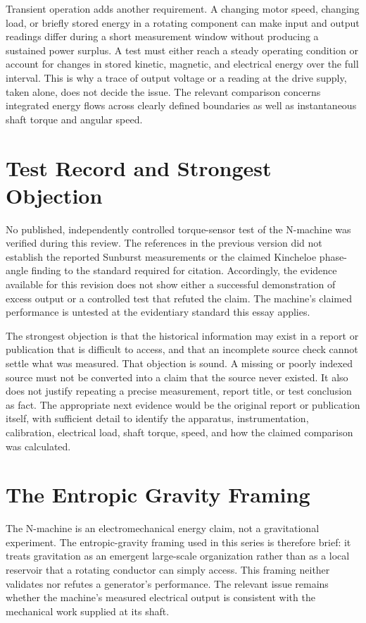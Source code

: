 \documentclass[11pt]{article}
\begin{document}
Transient operation adds another requirement. A changing motor speed, changing load, or briefly stored energy in a rotating component can make input and output readings differ during a short measurement window without producing a sustained power surplus. A test must either reach a steady operating condition or account for changes in stored kinetic, magnetic, and electrical energy over the full interval. This is why a trace of output voltage or a reading at the drive supply, taken alone, does not decide the issue. The relevant comparison concerns integrated energy flows across clearly defined boundaries as well as instantaneous shaft torque and angular speed.

\section{Test Record and Strongest Objection}

No published, independently controlled torque-sensor test of the N-machine was verified during this review. The references in the previous version did not establish the reported Sunburst measurements or the claimed Kincheloe phase-angle finding to the standard required for citation. Accordingly, the evidence available for this revision does not show either a successful demonstration of excess output or a controlled test that refuted the claim. The machine's claimed performance is untested at the evidentiary standard this essay applies.

The strongest objection is that the historical information may exist in a report or publication that is difficult to access, and that an incomplete source check cannot settle what was measured. That objection is sound. A missing or poorly indexed source must not be converted into a claim that the source never existed. It also does not justify repeating a precise measurement, report title, or test conclusion as fact. The appropriate next evidence would be the original report or publication itself, with sufficient detail to identify the apparatus, instrumentation, calibration, electrical load, shaft torque, speed, and how the claimed comparison was calculated.

\section{The Entropic Gravity Framing}

The N-machine is an electromechanical energy claim, not a gravitational experiment. The entropic-gravity framing used in this series is therefore brief: it treats gravitation as an emergent large-scale organization rather than as a local reservoir that a rotating conductor can simply access. This framing neither validates nor refutes a generator's performance. The relevant issue remains whether the machine's measured electrical output is consistent with the mechanical work supplied at its shaft.
\end{document}
